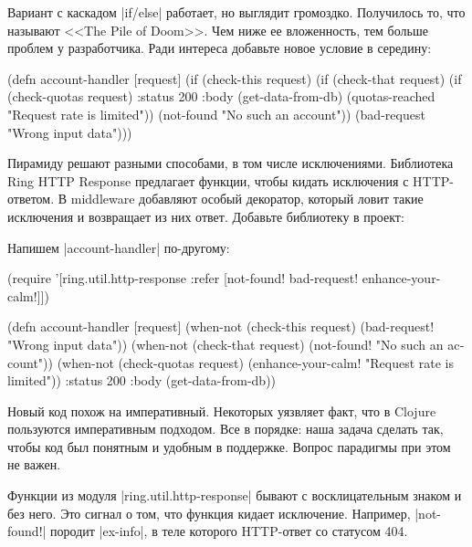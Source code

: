 Вариант с каскадом \spverb|if/else| работает, но выглядит громоздко. Получилось
то, что называют <<The Pile of Doom>>. Чем ниже ее вложенность, тем больше
проблем у разработчика. Ради интереса добавьте новое условие в середину:

\begin{english}
  \begin{clojure}
(defn account-handler [request]
  (if (check-this request)
    (if (check-that request)
      (if (check-quotas request)
        {:status 200
         :body (get-data-from-db)}
        (quotas-reached "Request rate is limited"))
      (not-found "No such an account"))
    (bad-request "Wrong input data")))
  \end{clojure}
\end{english}

Пирамиду решают разными способами, в том числе исключениями. Библиотека Ring
HTTP Response предлагает функции, чтобы кидать исключения с HTTP-ответом. В
middleware добавляют особый декоратор, который ловит такие исключения и
возвращает из них ответ. Добавьте библиотеку в проект:

\begin{english}
  \begin{clojure}
  \end{clojure}
\end{english}

Напишем \spverb|account-handler| по-другому:

\begin{english}
  \begin{clojure}
(require '[ring.util.http-response
           :refer [not-found!
                   bad-request!
                   enhance-your-calm!]])

(defn account-handler [request]
  (when-not (check-this request)
    (bad-request! "Wrong input data"))
  (when-not (check-that request)
    (not-found! "No such an account"))
  (when-not (check-quotas request)
    (enhance-your-calm! "Request rate is limited"))
  {:status 200
   :body (get-data-from-db)})
  \end{clojure}
\end{english}

Новый код похож на императивный. Некоторых уязвляет факт, что в Clojure
пользуются императивным подходом. Все в порядке: наша задача сделать так, чтобы
код был понятным и удобным в поддержке. Вопрос парадигмы при этом не важен.

Функции из модуля \spverb|ring.util.http-response| бывают с восклицательным
знаком и без него. Это сигнал о том, что функция кидает исключение. Например,
\spverb|not-found!| породит \spverb|ex-info|, в теле которого HTTP-ответ со
статусом 404.

